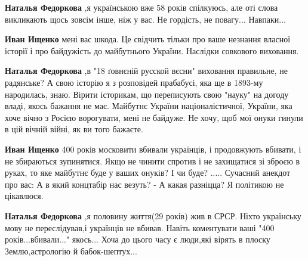 \begin{itemize}
\begin{itemize}
\begin{itemize}
\textbf{Наталья Федоркова} ,я українською вже 58 років спілкуюсь, але оті слова
викликають щось зовсім інше, ніж у вас. Не гордість, не повагу... Навпаки...

 
\textbf{Иван Ищенко} мені вас шкода. Це свідчить тільки про ваше незнання
власної історії і про байдужість до майбутнього України. Наслідки совкового
виховання.

 
\textbf{Наталья Федоркова} ,в "18 ґовнєній русской вєсни" виховання
правильне, не радянське? А свою історію я з розповідей прабабусі, яка ще в
1893-му народилась, знаю. Вірити історикам, що переписують свою "науку" на догоду
владі, якось бажання не має. Майбутнє України націоналістичної, України, яка хоче
вічно з Росією ворогувати, мені не байдуже. Не хочу, щоб мої онуки гинули в цій
вічній війні, як ви того бажаєте.

 
\textbf{Иван Ищенко} 400 років московити вбивали українців, і продовжують
вбивати, і не збираються зупинятися. Якщо не чинити спротив і не захищатися зі
зброєю в руках, то яке майбутнє буде у ваших онуків? І чи буде? ..... Сучасний
анекдот про вас: А в який концтабір нас везуть? - А какая разніцца? Я політикою
не цікавлюся.

 
\textbf{Наталья Федоркова} ,я половину життя(29 років) жив в СРСР. Ніхто
українську мову не переслідував,і українців не вбивав. Навіть коментувати ваші
"400 років...вбивали..." якось... Хоча до цього часу є люди,які вірять в плоску
Землю,астрологію й бабок-шептух...



\end{itemize}
\end{itemize}
\end{itemize}
